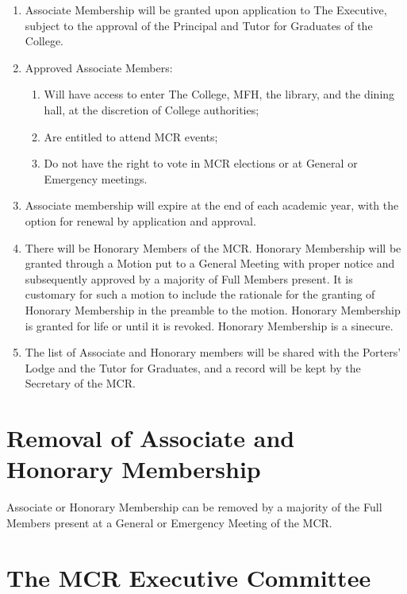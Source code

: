 \documentclass[11pt, a4paper]{article}
\begin{document}
\begin{enumerate}
\begin{enumerate}
		\end{enumerate}
    \item Associate Membership will be granted upon application to The Executive, subject to the approval of the Principal and Tutor for Graduates of the College.
    \item Approved Associate Members:
    	\begin{enumerate}
      		\item Will have access to enter The College, MFH, the library, and the dining hall, at the discretion of College authorities;
            \item Are entitled to attend MCR events;
            \item Do not have the right to vote in MCR elections or at General or Emergency meetings.
		\end{enumerate}
    \item Associate membership will expire at the end of each academic year, with the option for renewal by application and approval.
    \item There will be Honorary Members of the MCR. Honorary Membership will be granted through a Motion put to a General Meeting with proper notice and subsequently approved by a majority of Full Members present. It is customary for such a motion to include the rationale for the granting of Honorary Membership in the preamble to the motion. Honorary Membership is granted for life or until it is revoked. Honorary Membership is a sinecure.
     \item The list of Associate and Honorary members will be shared with the Porters' Lodge and the Tutor for Graduates, and a record will be kept by the Secretary of the MCR.
\end{enumerate}





\section{Removal of Associate and Honorary Membership}
\label{sec:removal_member}

Associate or Honorary Membership can be removed by a majority of the Full Members present at a General or Emergency Meeting of the MCR.





\section{The MCR Executive Committee}
\label{sec:executive}
\end{document}
